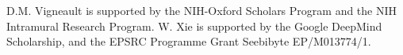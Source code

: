 
D.M. Vigneault is supported by the NIH-Oxford Scholars Program and the NIH Intramural Research Program.
W. Xie is supported by the Google DeepMind Scholarship, and the EPSRC Programme Grant Seebibyte EP/M013774/1.
